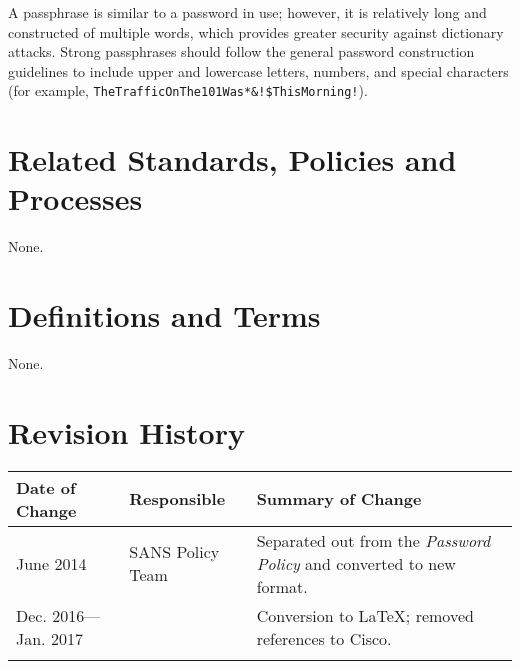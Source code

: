 A passphrase is similar to a password in use; however, it is relatively long and constructed of multiple words, which provides greater security against dictionary attacks.  
Strong passphrases should follow the general password construction guidelines to include upper and lowercase letters, numbers, and special characters (for example, \texttt{TheTrafficOnThe101Was*\&!\$ThisMorning!}).

\CommonPolicyCompliance
\section{Related Standards, Policies\oxford{} and Processes}
None.
\section{Definitions and Terms}
None.
\section{Revision History}
\begin{tabular}{|p{1.25in}|p{1.25in}|p{3in}|}
\hline
	Date of Change&
	Responsible&
	Summary of Change\\
\hline
	June 2014&
	SANS Policy Team&
	Separated out from the \textsl{Password Policy} and converted to new format.\\
\hline
	Dec. 2016---Jan. 2017&
	\xio{}&
	Conversion to \LaTeX{}; removed references to Cisco.\\
\hline
	 &
	 &
	 \\
\hline
\end{tabular}
